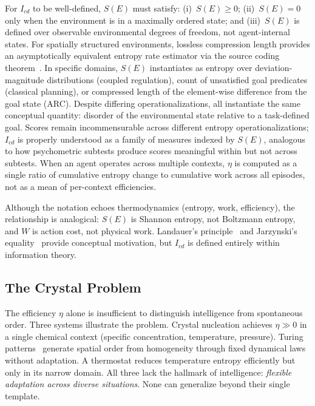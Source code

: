 \documentclass[runningheads,a4paper]{llncs}
\begin{document}
For $I_{cd}$ to be well-defined, $S(E)$ must satisfy: (i)~$S(E) \geq 0$; (ii)~$S(E) = 0$ only when the environment is in a maximally ordered state; and (iii)~$S(E)$ is defined over observable environmental degrees of freedom, not agent-internal states. For spatially structured environments, lossless compression length provides an asymptotically equivalent entropy rate estimator via the source coding theorem~\cite{cover2006elements}. In specific domains, $S(E)$ instantiates as entropy over deviation-magnitude distributions (coupled regulation), count of unsatisfied goal predicates (classical planning), or compressed length of the element-wise difference from the goal state (ARC). Despite differing operationalizations, all instantiate the same conceptual quantity: disorder of the environmental state relative to a task-defined goal. Scores remain incommensurable across different entropy operationalizations; $I_{cd}$ is properly understood as a family of measures indexed by $S(E)$, analogous to how psychometric subtests produce scores meaningful within but not across subtests. When an agent operates across multiple contexts, $\eta$ is computed as a single ratio of cumulative entropy change to cumulative work across all episodes, not as a mean of per-context efficiencies.

Although the notation echoes thermodynamics (entropy, work, efficiency), the relationship is analogical: $S(E)$ is Shannon entropy, not Boltzmann entropy, and $W$ is action cost, not physical work. Landauer's principle~\cite{landauer1961irreversibility} and Jarzynski's equality~\cite{jarzynski1997nonequilibrium} provide conceptual motivation, but $I_{cd}$ is defined entirely within information theory.

\subsection{The Crystal Problem}
\label{sec:crystal}

The efficiency $\eta$ alone is insufficient to distinguish intelligence from spontaneous order. Three systems illustrate the problem. Crystal nucleation achieves $\eta \gg 0$ in a single chemical context (specific concentration, temperature, pressure). Turing patterns~\cite{turing1952chemical} generate spatial order from homogeneity through fixed dynamical laws without adaptation. A thermostat reduces temperature entropy efficiently but only in its narrow domain. All three lack the hallmark of intelligence: \emph{flexible adaptation across diverse situations}. None can generalize beyond their single template.
\end{document}
